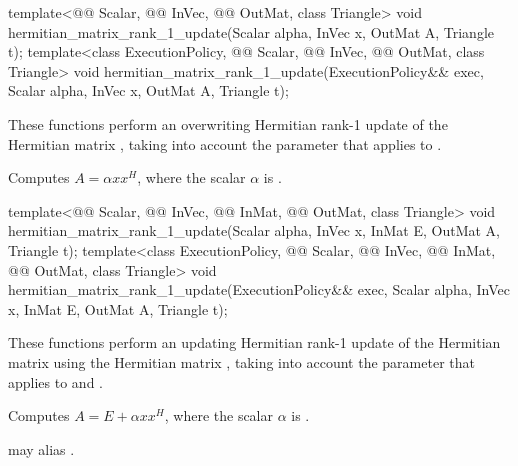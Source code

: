 %
\begin{itemdecl}
template<@@ Scalar, @@ InVec, @@ OutMat, class Triangle>
  void hermitian_matrix_rank_1_update(Scalar alpha, InVec x, OutMat A, Triangle t);
template<class ExecutionPolicy,
         @@ Scalar, @@ InVec, @@ OutMat, class Triangle>
  void hermitian_matrix_rank_1_update(ExecutionPolicy&& exec,
                                      Scalar alpha, InVec x, OutMat A, Triangle t);
\end{itemdecl}

\begin{itemdescr}
\pnum
These functions perform
an overwriting Hermitian rank-1 update of the Hermitian matrix ,
taking into account the  parameter
that applies to .

\pnum
\effects
Computes $A = \alpha x x^H$,
where the scalar $\alpha$ is .
\end{itemdescr}

%
\begin{itemdecl}
template<@@ Scalar, @@ InVec, @@ InMat, @@ OutMat,
         class Triangle>
  void hermitian_matrix_rank_1_update(Scalar alpha, InVec x, InMat E, OutMat A, Triangle t);
template<class ExecutionPolicy,
         @@ Scalar, @@ InVec, @@ InMat, @@ OutMat,
         class Triangle>
  void hermitian_matrix_rank_1_update(ExecutionPolicy&& exec,
                                      Scalar alpha, InVec x, InMat E, OutMat A, Triangle t);
\end{itemdecl}

\begin{itemdescr}
\pnum
These functions perform
an updating Hermitian rank-1 update of the Hermitian matrix 
using the Hermitian matrix ,
taking into account the  parameter
that applies to  and .

\pnum
\effects
Computes $A = E + \alpha x x^H$,
where the scalar $\alpha$ is .

\pnum
\remarks
{} may alias .
\end{itemdescr}


